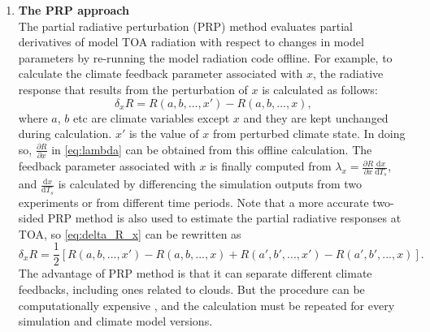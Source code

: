 \begin{enumerate}[label={(\arabic*)}]
    \item \textbf{The PRP approach}\\
    The partial radiative perturbation (PRP) method \citep{Wetherald1988cloud} evaluates partial derivatives of model TOA radiation with respect to changes in model parameters by re-running the model radiation code offline. For example, to calculate the climate feedback parameter associated with $x$, the radiative response that results from the perturbation of $x$ is calculated as follows:
    \begin{equation}
        \delta_x R = R(a,b,...,x') - R(a,b,...,x),
        \label{eq:delta_R_x}
    \end{equation}
    where $a$, $b$ etc are climate variables except $x$ and they are kept unchanged during calculation. $x'$ is the value of $x$ from perturbed climate state. In doing so, $\frac{\partial R}{\partial x}$ in \eqref{eq:lambda} can be obtained from this offline calculation. The feedback parameter associated with $x$ is finally computed from $\lambda_x = \frac{\partial R}{\partial x}\frac{\mathrm{d} x}{\mathrm{d} T_s}$, and $\frac{\mathrm{d} x}{\mathrm{d} T_s}$ is calculated by differencing the simulation outputs from two experiments or from different time periods. Note that a more accurate two-sided PRP method \citep{Colman1997} is also used to estimate the partial radiative responses at TOA, so \eqref{eq:delta_R_x} can be rewritten as
    \begin{equation}
        \delta_x R = \frac{1}{2} \left[R(a,b,...,x') - R(a,b,...,x) + R(a',b',...,x') - R(a',b',...,x) \right].
    \end{equation}
    The advantage of PRP method is that it can separate different climate feedbacks, including ones related to clouds. But the procedure can be computationally expensive \citep{Soden2008}, and the calculation  must be repeated for every simulation and climate model versions.
    

\end{enumerate}
